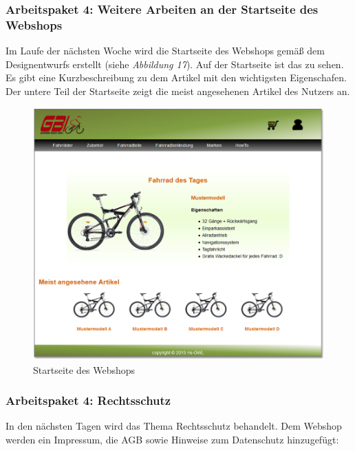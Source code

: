 \subsubsection{Arbeitspaket 4: Weitere Arbeiten an der Startseite des Webshops}

Im Laufe der nächsten Woche wird die Startseite des Webshops gemäß dem Designentwurfs erstellt (siehe \textit{Abbildung 17}). Auf der Startseite ist das \grqq{} zu sehen. Es gibt eine Kurzbeschreibung zu dem Artikel mit den wichtigsten Eigenschafen. Der untere Teil der Startseite zeigt die meist angesehenen Artikel des Nutzers an.

\begin{figure}[H]
\begin{center}

\includegraphics[width=150mm]{Bilder/Abbildung5-StartseiteDesWebshops.png}
\end{center}
\caption{Startseite des Webshops}
\end{figure}


\subsubsection{Arbeitspaket 4: Rechtsschutz}

In den nächsten Tagen wird das Thema Rechtsschutz behandelt. Dem Webshop werden ein Impressum, die AGB sowie Hinweise zum Datenschutz hinzugefügt:

